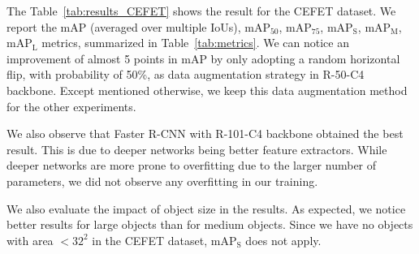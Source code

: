 The Table~\ref{tab:results_CEFET} shows the result for the CEFET dataset.
We report the mAP (averaged over multiple IoUs), mAP$_{50}$, mAP$_{75}$, mAP$_{\textrm{S}}$, mAP$_{\textrm{M}}$, mAP$_{\textrm{L}}$ metrics, summarized in Table~\ref{tab:metrics}.
We can notice an improvement of almost 5 points in mAP by only adopting a random horizontal flip, with probability of 50\%, as data augmentation strategy in R-50-C4 backbone.
Except mentioned otherwise, we keep this data augmentation method for the other experiments.
\begin{table}[b!]
\centering
\caption{Main results for CEFET dataset.}
\label{tab:results_CEFET}
\end{table}

We also observe that Faster R-CNN with R-101-C4 backbone obtained the best result.
This is due to deeper networks being better feature extractors.
While deeper networks are more prone to overfitting due to the larger number of parameters, we did not observe any overfitting in our training.

We also evaluate the impact of object size in the results.
As expected, we notice better results for large objects than for medium objects.
Since we have no objects with area $< 32^2$ in the CEFET dataset, mAP$_{\textrm{S}}$ does not apply.


